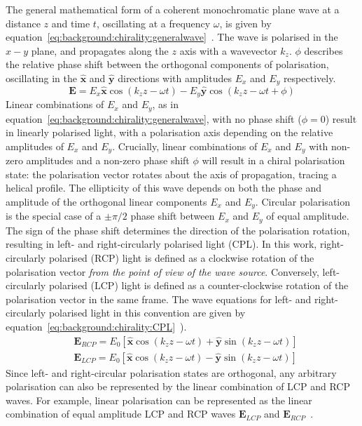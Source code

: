 The general mathematical form of a coherent monochromatic plane wave at a distance $z$ and time $t$, oscillating at a frequency $\omega$, is given by equation~\ref{eq:background:chirality:generalwave}~\cite[\S 8.1.1]{Hecht2013}. The wave is polarised in the $x-y$ plane, and propagates along the $z$ axis with a wavevector $k_z$. $\phi$ describes the relative phase shift between the orthogonal components of polarisation, oscillating in the $\mathbf{\hat{x}}$ and $\mathbf{\hat{y}}$ directions with amplitudes $E_x$ and $E_y$ respectively.
\begin{equation} \label{eq:background:chirality:generalwave}
    \mathbf{E}= E_x  \mathbf{\hat{x}} \cos(k_z z-\omega t) - E_y \mathbf{\hat{y}} \cos(k_z z-\omega t +\phi)
\end{equation}
Linear combinations of $E_x$ and $E_y$, as in equation~\ref{eq:background:chirality:generalwave}, with no phase shift ($\phi=0$) result in linearly polarised light, with a polarisation axis depending on the relative amplitudes of $E_x$ and $E_y$. Crucially, linear combinations of $E_x$ and $E_y$ with non-zero amplitudes and a non-zero phase shift $\phi$ will result in a chiral polarisation state: the polarisation vector rotates about the axis of propagation, tracing a helical profile. The ellipticity of this wave depends on both the phase and amplitude of the orthogonal linear components $E_x$ and $E_y$. Circular polarisation is the special case of a $\pm \pi/2$ phase shift between $E_x$ and $E_y$ of equal amplitude. The sign of the phase shift determines the direction of the polarisation rotation, resulting in left- and right-circularly polarised light (CPL). In this work, right-circularly polarised (RCP) light is defined as a clockwise rotation of the polarisation vector \textit{from the point of view of the wave source}. Conversely, left-circularly polarised (LCP) light is defined as a counter-clockwise rotation of the polarisation vector in the same frame. The wave equations for left- and right-circularly polarised light in this convention are given by equation~\ref{eq:background:chirality:CPL}~\cite[\S 8.1.2]{Hecht2013}). 
\begin{equation} \label{eq:background:chirality:CPL}
    \begin{split}
        & \mathbf{E}_{RCP} = E_0 \left[ \mathbf{\hat{x}} \cos(k_z z-\omega t) + \mathbf{\hat{y}} \sin(k_z z-\omega t )\right]\\
        & \mathbf{E}_{LCP}= E_0 \left[ \mathbf{\hat{x}} \cos(k_z z-\omega t) - \mathbf{\hat{y}} \sin(k_z z-\omega t )\right]
    \end{split}
\end{equation}
Since left- and right-circular polarisation states are orthogonal, any arbitrary polarisation can also be represented by the linear combination of LCP and RCP waves. For example, linear polarisation can be represented as the linear combination of equal amplitude LCP and RCP waves $\mathbf{E}_{LCP}$ and $\mathbf{E}_{RCP}$~\cite[\S 3.3]{Parson2007}. 

